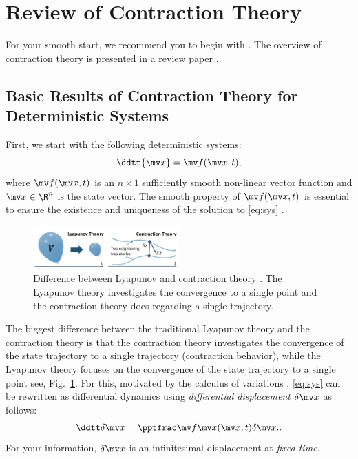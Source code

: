 
\section{Review of Contraction Theory}

For your smooth start, we recommend you to begin with \cite{LOHMILLER:1998aa}.
The overview of contraction theory is presented in a review paper \cite{Tsukamoto:2021aa}.

\subsection{Basic Results of Contraction Theory for Deterministic Systems}

First, we start with the following deterministic systems:
\begin{equation}
    \ddtt{\bdx}
    = 
    \bdf(\bdx,t)
    ,
    \label{eq:sys}
\end{equation}
where $\bdf(\bdx,t)$ is an $n\times1$ sufficiently smooth non-linear vector function and $\bdx\in\R^n$ is the state vector.
The smooth property of $\bdf(\bdx,t)$ is essential to ensure the existence and uniqueness of the solution to \eqref{eq:sys} \cite[see, pp. 88-89]{Khalil:2002aa}.

\begin{figure}[!t]
    \centering
    \includegraphics[width=0.5\textwidth]{figs/lyaVSctrac.png}
    \caption{
        Difference between Lyapunov and contraction theory \cite[Fig. 1]{Tsukamoto:2021aa}.
        The Lyapunov theory investigates the convergence to a single point and the contraction theory does regarding a single trajectory.
    }
    \label{fig:lyaVSctrac}
\end{figure}

The biggest difference between the traditional Lyapunov theory and the contraction theory is that the contraction theory investigates the convergence of the state trajectory to a single trajectory (contraction behavior), while the Lyapunov theory focuses on the convergence of the state trajectory to a single point \ie see, Fig.~\ref{fig:lyaVSctrac}.
For this, motivated by the calculus of variations \cite[Chap. 4]{Kirk:2004aa}, \eqref{eq:sys} can be rewritten as differential dynamics using \textit{differential displacement} $\delta\bdx$ as follows:
\begin{equation}
    \ddtt\delta\bdx
    =
    \tpfpx(\bdx,t)
    \delta\bdx.
    .
    \label{eq:diff_sys}
\end{equation}
For your information, $\delta\bdx$ is an infinitesimal displacement at \textit{fixed time}.

